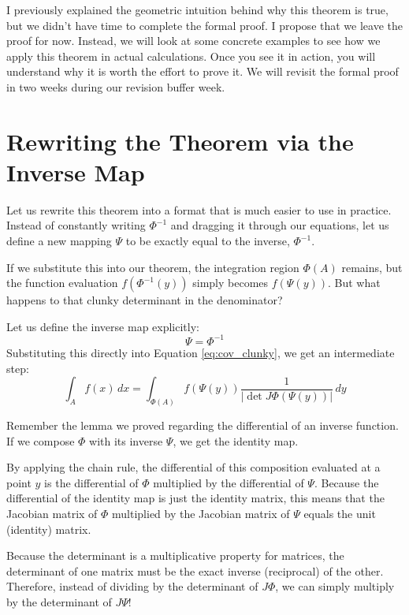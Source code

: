 \begin{spoken_clean}[00:03:50 - 00:06:50]
I previously explained the geometric intuition behind why this theorem is true, but we didn't have time to complete the formal proof. I propose that we leave the proof for now. Instead, we will look at some concrete examples to see how we apply this theorem in actual calculations. Once you see it in action, you will understand why it is worth the effort to prove it. We will revisit the formal proof in two weeks during our revision buffer week. 


\end{spoken_clean}

\section{Rewriting the Theorem via the Inverse Map}

\begin{spoken_clean}[00:06:50 - 00:08:20]
Let us rewrite this theorem into a format that is much easier to use in practice. Instead of constantly writing $\Phi^{-1}$ and dragging it through our equations, let us define a new mapping $\Psi$ to be exactly equal to the inverse, $\Phi^{-1}$. 

If we substitute this into our theorem, the integration region $\Phi(A)$ remains, but the function evaluation $f(\Phi^{-1}(y))$ simply becomes $f(\Psi(y))$. But what happens to that clunky determinant in the denominator? 
\end{spoken_clean}

\begin{math_stroke}
Let us define the inverse map explicitly:
\[
\Psi = \Phi^{-1}
\]
Substituting this directly into Equation \ref{eq:cov_clunky}, we get an intermediate step:
\[
\int_A f(x) \, dx = \int_{\Phi(A)} f(\Psi(y)) \frac{1}{|\det J\Phi(\Psi(y))|} \, dy
\]
\end{math_stroke}

\begin{spoken_clean}[00:08:20 - 00:10:45]
Remember the lemma we proved regarding the differential of an inverse function. If we compose $\Phi$ with its inverse $\Psi$, we get the identity map. 

By applying the chain rule, the differential of this composition evaluated at a point $y$ is the differential of $\Phi$ multiplied by the differential of $\Psi$. Because the differential of the identity map is just the identity matrix, this means that the Jacobian matrix of $\Phi$ multiplied by the Jacobian matrix of $\Psi$ equals the unit (identity) matrix.

Because the determinant is a multiplicative property for matrices, the determinant of one matrix must be the exact inverse (reciprocal) of the other. Therefore, instead of dividing by the determinant of $J\Phi$, we can simply multiply by the determinant of $J\Psi$!
\end{spoken_clean}

